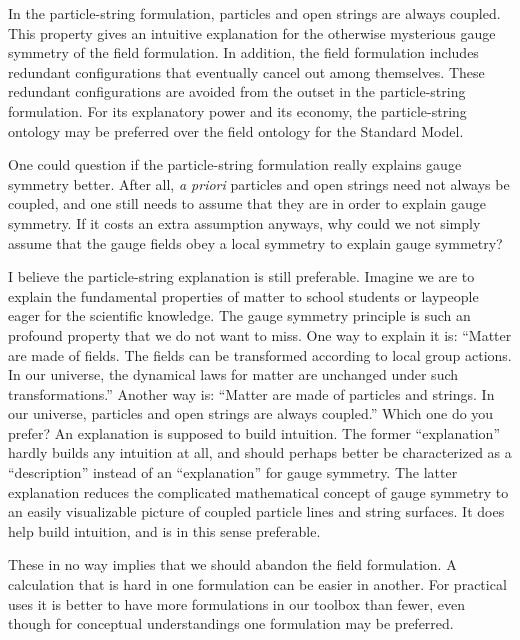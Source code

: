 \documentclass[12pt]{article}
\theoremstyle{definition}
\begin{document}
In the particle-string formulation, particles and open strings are always coupled. This property gives an intuitive explanation for the otherwise mysterious gauge symmetry of the field formulation. In addition, the field formulation includes redundant configurations that eventually cancel out among themselves. These redundant configurations are avoided from the outset in the particle-string formulation. For its explanatory power and its economy, the particle-string ontology may be preferred over the field ontology for the Standard Model.

One could question if the particle-string formulation really explains gauge symmetry better. After all, \textit{a priori} particles and open strings need not always be coupled, and one still needs to assume that they are in order to explain gauge symmetry. If it costs an extra assumption anyways, why could we not simply assume that the gauge fields obey a local symmetry to explain gauge symmetry?

I believe the particle-string explanation is still preferable. Imagine we are to explain the fundamental properties of matter to school students or laypeople eager for the scientific knowledge. The gauge symmetry principle is such an profound property that we do not want to miss. One way to explain it is: ``Matter are made of fields. The fields can be transformed according to local group actions. In our universe, the dynamical laws for matter are unchanged under such transformations.'' Another way is: ``Matter are made of particles and strings. In our universe, particles and open strings are always coupled.'' Which one do you prefer? An explanation is supposed to build intuition. The former ``explanation'' hardly builds any intuition at all, and should perhaps better be characterized as a ``description'' instead of an ``explanation'' for gauge symmetry. The latter explanation reduces the complicated mathematical concept of gauge symmetry to an easily visualizable picture of coupled particle lines and string surfaces. It does help build intuition, and is in this sense preferable.

These in no way implies that we should abandon the field formulation. A calculation that is hard in one formulation can be easier in another. For practical uses it is better to have more formulations in our toolbox than fewer, even though for conceptual understandings one formulation may be preferred.

\end{document}
